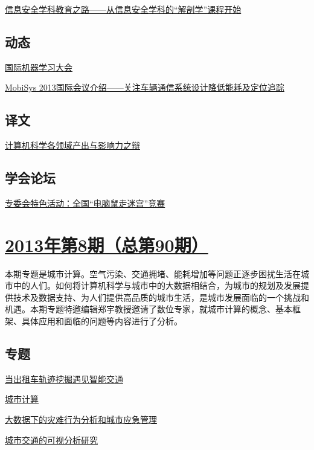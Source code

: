 \documentclass[a4paper]{article}
\begin{document}
\href{http://history.ccf.org.cn/resources/1190201776262/2013/09/18/8.pdf}{信息安全学科教育之路——从信息安全学科的“解剖学”课程开始}

\subsection{动态}
\href{http://history.ccf.org.cn/resources/1190201776262/2013/09/18/14.pdf}{国际机器学习大会}

\href{http://history.ccf.org.cn/resources/1190201776262/2013/09/18/13.pdf}{MobiSys 2013国际会议介绍——关注车辆通信系统设计降低能耗及定位追踪}

\subsection{译文}
\href{http://history.ccf.org.cn/resources/1190201776262/2013/09/18/15.pdf}{计算机科学各领域产出与影响力之辩}

\subsection{学会论坛}
\href{http://history.ccf.org.cn/resources/1190201776262/2013/09/18/16.pdf}{专委会特色活动：全国“电脑鼠走迷宫”竞赛}


\section{\href{http://history.ccf.org.cn/sites/ccf/jsjtbbd.jsp?contentId=2753023765862}{\textbf{2013年第8期（总第90期）}}}
本期专题是城市计算。空气污染、交通拥堵、能耗增加等问题正逐步困扰生活在城市中的人们。如何将计算机科学与城市中的大数据相结合，为城市的规划及发展提供技术及数据支持、为人们提供高品质的城市生活，是城市发展面临的一个挑战和机遇。本期专题特邀编辑郑宇教授邀请了数位专家，就城市计算的概念、基本框架、具体应用和面临的问题等内容进行了分析。
\subsection{专题}
\href{http://history.ccf.org.cn/resources/1190201776262/2013/08/16/5.pdf}{当出租车轨迹挖掘遇见智能交通}

\href{http://history.ccf.org.cn/resources/1190201776262/2013/08/15/1.pdf}{城市计算}

\href{http://history.ccf.org.cn/resources/1190201776262/2013/08/16/4.pdf}{大数据下的灾难行为分析和城市应急管理}

\href{http://history.ccf.org.cn/resources/1190201776262/2013/08/16/6.pdf}{城市交通的可视分析研究}
\end{document}
